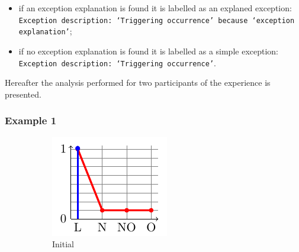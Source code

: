 \begin{itemize}
\item if an exception explanation is found it is labelled as an explaned exception: 
\texttt{Exception description: `Triggering occurrence' because `exception explanation'};
\item if no exception explanation is found it is labelled as a simple exception: 
\texttt{Exception description: `Triggering occurrence'}.
\end{itemize}
Hereafter the analysis performed for two participants of the experience is presented.

\subsubsection{Example 1}

\begin{figure}\centering
\begin{subfigure}[t]{.15\linewidth}
\includegraphics[width=\linewidth]{plot_tikz/speed1.pdf}
\caption{Initial}
\label{fig:a}
\end{subfigure}
\begin{subfigure}[t]{.15\linewidth}

\end{subfigure}
\end{figure}
